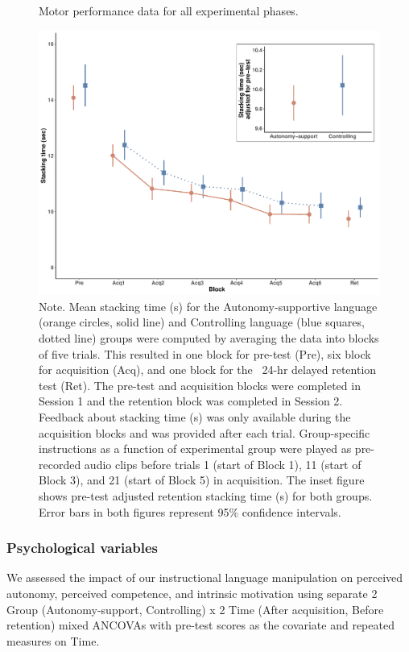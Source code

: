 \documentclass[doc,floatsintext,donotrepeattitle,letterpaper,12pt]{apa7}
\begin{document}
\begin{figure}[htbp]
    \caption{Motor performance data for all experimental phases.}
    \centering
    \includegraphics[scale=0.55]{../../figs/fig2.pdf}
    \setlength{\belowcaptionskip}{-2em}
    \caption*{\singlespacing \small Note. \normalfont Mean stacking time (s) for the Autonomy-supportive language (orange circles, solid line) and Controlling language (blue squares, dotted line) groups were computed by averaging the data into blocks of five trials. This resulted in one block for pre-test (Pre), six block for acquisition (Acq), and one block for the ~24-hr delayed retention test (Ret). The pre-test and acquisition blocks were completed in Session 1 and the retention block was completed in Session 2. Feedback about stacking time (s) was only available during the acquisition blocks and was provided after each trial. Group-specific instructions as a function of experimental group were played as pre-recorded audio clips before trials 1 (start of Block 1), 11 (start of Block 3), and 21 (start of Block 5) in acquisition. The inset figure shows pre-test adjusted retention stacking time (s) for both groups. Error bars in both figures represent 95\% confidence intervals.}
    \label{fig:fig2}
\end{figure}

\clearpage

\subsubsection{Psychological variables}

We assessed the impact of our instructional language manipulation on perceived autonomy, perceived competence, and intrinsic motivation using separate 2 Group (Autonomy-support, Controlling) x 2 Time (After acquisition, Before retention) mixed ANCOVAs with pre-test scores as the covariate and repeated measures on Time. 
\end{document}
